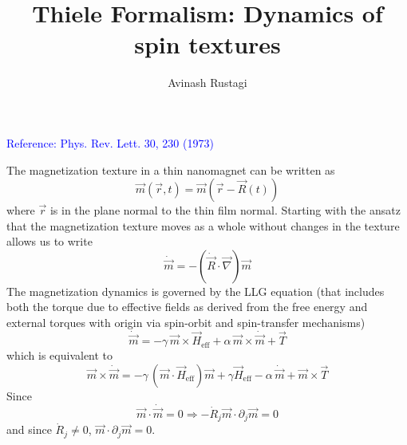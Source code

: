 \documentclass[aps,prb,onecolumn,notitlepage,showpacs,floatfix,superscriptaddress]{revtex4-1}
\newcommand{\mrm}[1]{\mathrm{#1}}
\begin{document}
\title{Thiele Formalism: Dynamics of spin textures}

\author{Avinash Rustagi}
%

\maketitle
%
\noindent \textcolor{blue}{Reference: Phys. Rev. Lett. 30, 230 (1973)}
\vspace{0.2in}

\noindent The magnetization texture in a thin nanomagnet can be written as
\begin{equation}
\vec{m}(\vec{r},t) = \vec{m}(\vec{r}-\vec{R}(t))
\end{equation}
where $\vec{r}$ is in the plane normal to the thin film normal. Starting with the ansatz that the magnetization texture moves as a whole without changes in the texture allows us to write 
\begin{equation}
\dot{\vec{m}} = - (\dot{\vec{R}}\cdot \vec{\nabla}) \vec{m}
\end{equation}
The magnetization dynamics is governed by the LLG equation (that includes both the torque due to effective fields as derived from the free energy and external torques with origin via spin-orbit and spin-transfer mechanisms)
\begin{equation}
\dot{\vec{m}} = -\gamma \, \vec{m} \times \vec{H}_\mrm{eff} + \alpha \, \vec{m} \times \dot{\vec{m}} + \vec{T}
\end{equation}
which is equivalent to
\begin{equation}
\vec{m} \times \dot{\vec{m}} = -\gamma \, (\vec{m} \cdot \vec{H}_\mrm{eff}) \vec{m} + \gamma \vec{H}_\mrm{eff} - \alpha \, \dot{\vec{m}} + \vec{m} \times \vec{T}
\end{equation}
Since
\begin{equation}
\vec{m} \cdot \dot{\vec{m}}= 0 \Rightarrow - \dot{R}_j \vec{m} \cdot \partial_j \vec{m} = 0
\end{equation}
and since $\dot{R}_j \neq 0$, $\vec{m} \cdot \partial_j \vec{m} = 0$.\\
\end{document}
